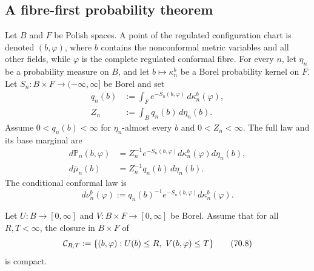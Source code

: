 \documentclass[11pt]{article}
\theoremstyle{remark}
\begin{document}
\subsection{A fibre-first probability theorem}

Let \(B\) and \(F\) be Polish spaces.  A point of the regulated
configuration chart is denoted \((b,\varphi)\), where \(b\) contains
the nonconformal metric variables and all other fields, while
\(\varphi\) is the complete regulated conformal fibre.  For every
\(n\), let \(\eta_n\) be a probability measure on \(B\), and let
\(b\mapsto\kappa_n^b\) be a Borel probability kernel on \(F\).
Let \(S_n:B\times F\to(-\infty,\infty]\) be Borel and set
\begin{align}
 q_n(b)&:=\int_F e^{-S_n(b,\varphi)}\,d\kappa_n^b(\varphi),
                                                               \tag{70.3}\\
 Z_n&:=\int_B q_n(b)\,d\eta_n(b).                              \tag{70.4}
\end{align}
Assume \(0<q_n(b)<\infty\) for \(\eta_n\)-almost every \(b\) and
\(0<Z_n<\infty\).  The full law and its base marginal are
\begin{align}
 d{\mathbb P}_n(b,\varphi)
 &=Z_n^{-1}e^{-S_n(b,\varphi)}
   d\kappa_n^b(\varphi)d\eta_n(b),                            \tag{70.5}\\
 d\overline\mu_n(b)&=Z_n^{-1}q_n(b)\,d\eta_n(b).              \tag{70.6}
\end{align}
The conditional conformal law is
\[
 d\nu_n^b(\varphi)
 :=q_n(b)^{-1}e^{-S_n(b,\varphi)}d\kappa_n^b(\varphi).        \tag{70.7}
\]

Let \(U:B\to[0,\infty]\) and
\(V:B\times F\to[0,\infty]\) be Borel.  Assume that for all
\(R,T<\infty\), the closure in \(B\times F\) of
\begin{equation}
 {\cal C}_{R,T}
 :=\{(b,\varphi):U(b)\leq R,\ V(b,\varphi)\leq T\}            \tag{70.8}
\end{equation}
is compact.
\end{document}

